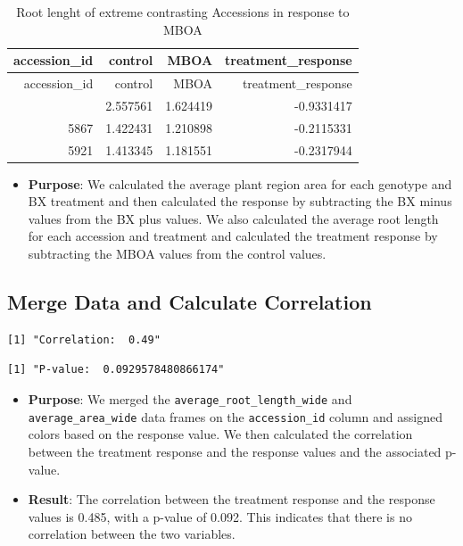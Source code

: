\documentclass[
  11pt,
]{article}
\providecommand{\tightlist}{%
  \setlength{\itemsep}{0pt}\setlength{\parskip}{0pt}}\usepackage{longtable,booktabs,array}
\begin{document}
\begin{longtable}[]{@{}rrrr@{}}
\caption{Root lenght of extreme contrasting Accessions in response to
MBOA}\tabularnewline
\toprule\noalign{}
accession\_id & control & MBOA & treatment\_response \\
\midrule\noalign{}
\endfirsthead
\toprule\noalign{}
accession\_id & control & MBOA & treatment\_response \\
\midrule\noalign{}
\endhead
\bottomrule\noalign{}
\endlastfoot
506 & 2.557561 & 1.624419 & -0.9331417 \\
5867 & 1.422431 & 1.210898 & -0.2115331 \\
5921 & 1.413345 & 1.181551 & -0.2317944 \\
\end{longtable}

\begin{itemize}
\tightlist
\item
  \textbf{Purpose}: We calculated the average plant region area for each
  genotype and BX treatment and then calculated the response by
  subtracting the BX minus values from the BX plus values. We also
  calculated the average root length for each accession and treatment
  and calculated the treatment response by subtracting the MBOA values
  from the control values.
\end{itemize}

\subsection{Merge Data and Calculate
Correlation}\label{merge-data-and-calculate-correlation}

\begin{verbatim}
[1] "Correlation:  0.49"
\end{verbatim}

\begin{verbatim}
[1] "P-value:  0.0929578480866174"
\end{verbatim}

\begin{itemize}
\item
  \textbf{Purpose}: We merged the \texttt{average\_root\_length\_wide}
  and \texttt{average\_area\_wide} data frames on the
  \texttt{accession\_id} column and assigned colors based on the
  response value. We then calculated the correlation between the
  treatment response and the response values and the associated p-value.
\item
  \textbf{Result}: The correlation between the treatment response and
  the response values is 0.485, with a p-value of 0.092. This indicates
  that there is no correlation between the two variables.
\end{itemize}
\end{document}
